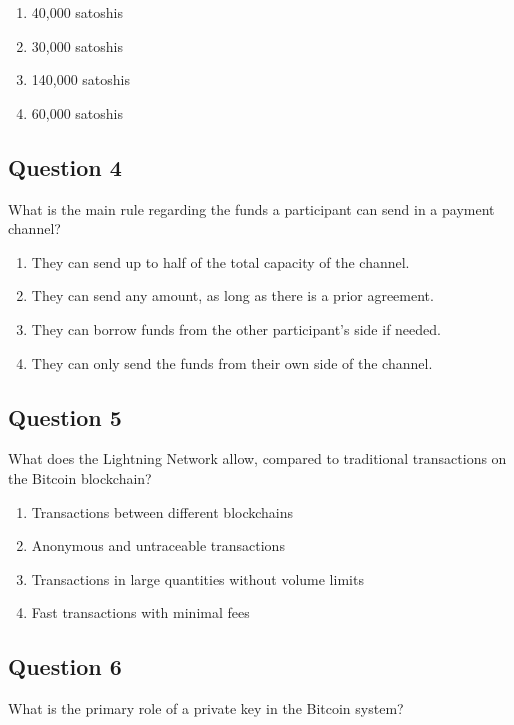 \documentclass[12pt,a4paper]{article}
\begin{document}
\begin{enumerate}[label=\Alph*., leftmargin=*]
\item 40,000 satoshis
\item 30,000 satoshis
\item 140,000 satoshis
\item 60,000 satoshis
\end{enumerate}

\bigskip


\subsection*{Question 4}
What is the main rule regarding the funds a participant can send in a payment channel?

\begin{enumerate}[label=\Alph*., leftmargin=*]
\item They can send up to half of the total capacity of the channel.
\item They can send any amount, as long as there is a prior agreement.
\item They can borrow funds from the other participant's side if needed.
\item They can only send the funds from their own side of the channel.
\end{enumerate}

\bigskip


\subsection*{Question 5}
What does the Lightning Network allow, compared to traditional transactions on the Bitcoin blockchain?

\begin{enumerate}[label=\Alph*., leftmargin=*]
\item Transactions between different blockchains
\item Anonymous and untraceable transactions
\item Transactions in large quantities without volume limits
\item Fast transactions with minimal fees
\end{enumerate}

\bigskip


\subsection*{Question 6}
What is the primary role of a private key in the Bitcoin system?
\end{document}
